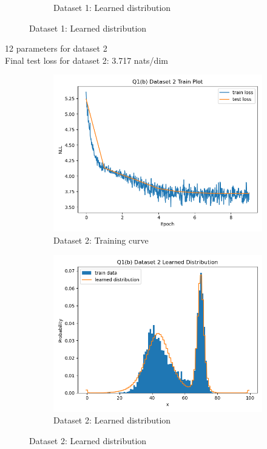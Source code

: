 \documentclass{article}
\begin{document}
\begin{enumerate}[(a)]
\begin{figure}[H]
\begin{subfigure}{0.45\textwidth}
        \caption{Dataset 1: Learned distribution}
    \end{subfigure}
\end{figure}
12 parameters for dataset 2 \\
Final test loss for dataset 2: 3.717 nats/dim
\begin{figure}[H]
    \centering
    \begin{subfigure}{0.45\textwidth}
        \centering
        \includegraphics[width=\textwidth]{figures/q1_b_dset2_train_plot.png}
        \caption{Dataset 2: Training curve}
    \end{subfigure}
    \hspace{0.2in}
    \begin{subfigure}{0.45\textwidth}
        \centering
        \includegraphics[width=\textwidth]{figures/q1_b_dset2_learned_dist.png}
        \caption{Dataset 2: Learned distribution}
    \end{subfigure}
\end{figure}
\end{enumerate}
\end{document}
